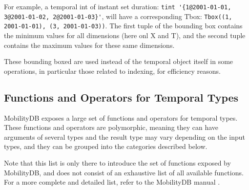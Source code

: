 For example, a temporal int of instant set duration: \lstinline+tint '{1@2001-01-01, 3@2001-01-02, 2@2001-01-03}'+, will have a corresponding Tbox: \lstinline{Tbox((1, 2001-01-01), (3, 2001-01-03))}. The first tuple of the bounding box contains the minimum values for all dimensions (here onl X and T), and the second tuple contains the maximum values  for these same dimensions.

These bounding boxed are used instead of the temporal object itself in some operations, in particular those related to indexing, for efficiency reasons.

\subsection{Functions and Operators for Temporal Types}
\label{section:mobilitydb_functions}

MobilityDB exposes a large set of functions and operators for temporal types. These functions and operators are polymorphic, meaning they can have arguments of several types and the result type may vary depending on the input types, and they can be grouped into the categories described below. 

Note that this list is only there to introduce the set of functions exposed by MobilityDB, and does not consist of an exhaustive list of all available functions. For a more complete and detailed list, refer to the MobilityDB manual \cite{mobiliydb_manual}.

